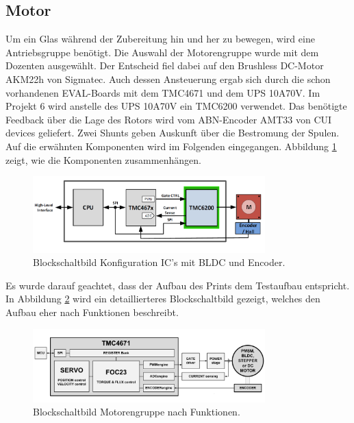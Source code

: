 \clearpage
\subsection{Motor}
\label{subsec:Motor}

Um ein Glas während der Zubereitung hin und her zu bewegen, wird eine Antriebsgruppe benötigt. Die Auswahl der Motorengruppe wurde mit dem Dozenten ausgewählt. Der Entscheid fiel dabei auf den Brushless DC-Motor AKM22h von Sigmatec. Auch dessen Ansteuerung ergab sich durch die schon vorhandenen EVAL-Boards mit dem TMC4671 und dem UPS 10A70V. Im Projekt 6 wird anstelle des UPS 10A70V ein TMC6200 verwendet. Das benötigte Feedback über die Lage des Rotors wird vom ABN-Encoder AMT33 von CUI devices geliefert. Zwei Shunts geben Auskunft über die Bestromung der Spulen. Auf die erwähnten Komponenten wird im Folgenden eingegangen. Abbildung \ref{fig:Blockdiagramm_TMC4671_und_TMC6200} zeigt, wie die Komponenten zusammenhängen.

\begin{figure}[H]
	\centering
	\includegraphics[width=0.8\textwidth]{graphics/Blockdiagramm_TMC4671_und_TMC6200}
	\caption{Blockschaltbild Konfiguration IC's mit BLDC und Encoder. \cite[S.1]{trinamicmotion_control_gmbh__co_kg_tmc6200_2019}}
	\label{fig:Blockdiagramm_TMC4671_und_TMC6200}
\end{figure}

Es wurde darauf geachtet, dass der Aufbau des Prints dem Testaufbau entspricht. In Abbildung \ref{fig:Blockdiagramm_Motorengruppe} wird ein detaillierteres Blockschaltbild gezeigt, welches den Aufbau eher nach Funktionen beschreibt.

\begin{figure}[H]
	\centering
	\includegraphics[width=0.8\textwidth]{graphics/Blockdiagramm_Motorengruppe}
	\caption{Blockschaltbild Motorengruppe nach Funktionen. \cite[S.1]{trinamicmotion_control_gmbh__co_kg_tmc4671_2019}}
	\label{fig:Blockdiagramm_Motorengruppe}
\end{figure}

